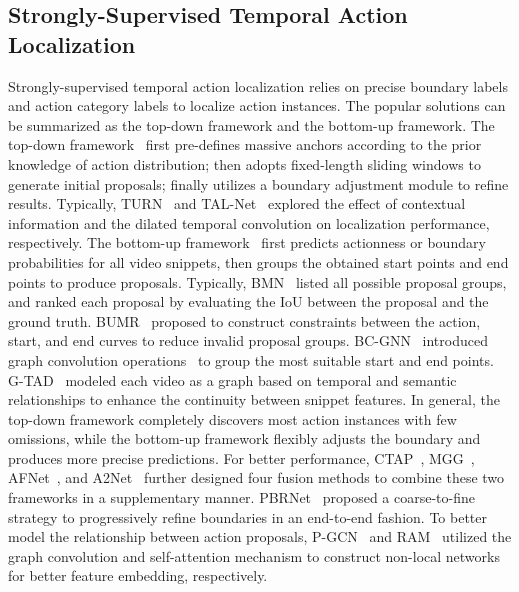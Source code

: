 \documentclass[journal]{IEEEtran}
\begin{document}
\subsection{Strongly-Supervised Temporal Action Localization}
Strongly-supervised temporal action localization relies on precise boundary labels and action category labels to localize action instances. The popular solutions can be summarized as the top-down framework and the bottom-up framework. The top-down framework~\cite{shou2016temporal,shou2017cdc,lin2017single,xu2017r,gao2017turn,long2019gaussian,chao2018rethinking,song2018temporal,guo2018fully,sun2021exploiting,zhou2020temporal,liu2019multiscale} first pre-defines massive anchors according to the prior knowledge of action distribution; then adopts fixed-length sliding windows to generate initial proposals; finally utilizes a boundary adjustment module to refine results. Typically, TURN~\cite{gao2017turn} and TAL-Net~\cite{chao2018rethinking} explored the effect of contextual information and the dilated temporal convolution on localization performance, respectively. The bottom-up framework~\cite{zhao2017temporal,lin2018bsn,lin2019bmn,lin2019fast,zhao2020bottom,bai2020boundary,xu2020g,gao2020accurate,long2019coarse} first predicts actionness or boundary probabilities for all video snippets, then groups the obtained start points and end points to produce proposals. Typically, BMN~\cite{lin2019bmn} listed all possible proposal groups, and ranked each proposal by evaluating the IoU between the proposal and the ground truth. BUMR~\cite{zhao2020bottom} proposed to construct constraints between the action, start, and end curves to reduce invalid proposal groups. BC-GNN~\cite{bai2020boundary} introduced graph convolution operations~\cite{schlichtkrull2018modeling} to group the most suitable start and end points. G-TAD~\cite{xu2020g} modeled each video as a graph based on temporal and semantic relationships to enhance the continuity between snippet features.
In general, the top-down framework completely discovers most action instances with few omissions, while the bottom-up framework flexibly adjusts the boundary and produces more precise predictions. For better performance, CTAP~\cite{gao2018ctap}, MGG~\cite{liu2019multi}, AFNet~\cite{chen2020afnet}, and A2Net~\cite{yang2020revisiting} further designed four fusion methods to combine these two frameworks in a supplementary manner. PBRNet~\cite{liu2020progressive} proposed a coarse-to-fine strategy to progressively refine boundaries in an end-to-end fashion. To better model the relationship between action proposals, P-GCN~\cite{zeng2019graph} and RAM~\cite{chen2019relation} utilized the graph convolution and self-attention mechanism to construct non-local networks for better feature embedding, respectively.
\end{document}
